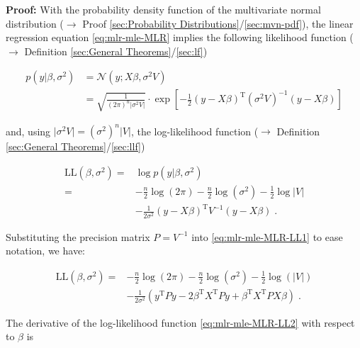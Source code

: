\documentclass[a4paper,12pt,twoside]{book}
\begin{document}
\vspace{1em}
\textbf{Proof:} With the probability density function of the multivariate normal distribution ($\rightarrow$ Proof \ref{sec:Probability Distributions}/\ref{sec:mvn-pdf}), the linear regression equation \eqref{eq:mlr-mle-MLR} implies the following likelihood function ($\rightarrow$ Definition \ref{sec:General Theorems}/\ref{sec:lf})

\begin{equation} \label{eq:mlr-mle-MLR-LF}
\begin{split}
p(y|\beta,\sigma^2) &= \mathcal{N}(y; X\beta, \sigma^2 V) \\
&= \sqrt{\frac{1}{(2\pi)^n |\sigma^2 V|}} \cdot \exp\left[ -\frac{1}{2} (y - X\beta)^\mathrm{T} (\sigma^2 V)^{-1} (y - X\beta) \right]
\end{split}
\end{equation}

and, using $\lvert \sigma^2 V \rvert = (\sigma^2)^n \lvert V \rvert$, the log-likelihood function ($\rightarrow$ Definition \ref{sec:General Theorems}/\ref{sec:llf})

\begin{equation} \label{eq:mlr-mle-MLR-LL1}
\begin{split}
\mathrm{LL}(\beta,\sigma^2) = &\log p(y|\beta,\sigma^2) \\
= &- \frac{n}{2} \log(2\pi) - \frac{n}{2} \log (\sigma^2) - \frac{1}{2} \log |V| \\
&- \frac{1}{2 \sigma^2} (y - X\beta)^\mathrm{T} V^{-1} (y - X\beta) \; .
\end{split}
\end{equation}

Substituting the precision matrix $P = V^{-1}$ into \eqref{eq:mlr-mle-MLR-LL1} to ease notation, we have:

\begin{equation} \label{eq:mlr-mle-MLR-LL2}
\begin{split}
\mathrm{LL}(\beta,\sigma^2) = &- \frac{n}{2} \log(2\pi) - \frac{n}{2} \log(\sigma^2) - \frac{1}{2} \log(|V|) \\
&- \frac{1}{2 \sigma^2} \left( y^\mathrm{T} P y - 2 \beta^\mathrm{T} X^\mathrm{T} P y + \beta^\mathrm{T} X^\mathrm{T} P X \beta \right) \; .
\end{split}
\end{equation}

\vspace{1em}
The derivative of the log-likelihood function \eqref{eq:mlr-mle-MLR-LL2} with respect to $\beta$ is
\end{document}
